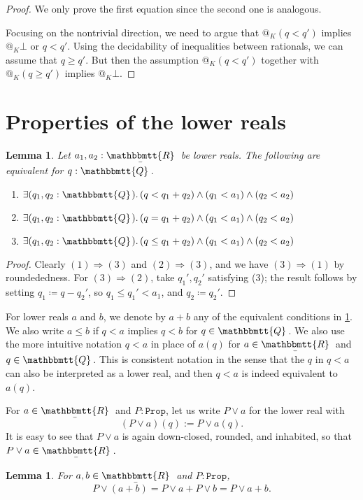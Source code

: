 \documentclass[11pt, oneside, article]{memoir}
\makeatletter
\theoremstyle{plain}
\newtheorem{lemma}[theorem]{Lemma}
\theoremstyle{definition}
\theoremstyle{remark}
\newcommand{\const}[1]{\mathtt{#1}}
\newcommand{\ubar}[1]{\underaccent{\bar}{#1}}
\newcommand{\internal}[1]{\raisebox{-.03ex}{$\mathbbmtt{#1}$}}
\newcommand{\hs}{\hspace{1.1pt}}
\newcommand{\tQQ}{\internal{Q}\hs}
\newcommand{\tRR}{\internal{R}\hs}
\newcommand{\tLR}{\ubar{\tRR}\hs}
\newcommand{\Prop}{\const{Prop}}
\newcommand{\AtSymbol}{{@}}
\newcommand{\At}[2][]{\AtSymbol^{#1}_{#2}}
\newcommand{\imp}{\Rightarrow}
\makeatother
\begin{document}
\begin{proof}
	We only prove the first equation since the second one is analogous.

	Focusing on the nontrivial direction, we need to argue that $\At{K}(q < q')$ implies $\At{K}\bot$ or $q < q'$. Using the decidability of inequalities between rationals, we can assume that $q \geq q'$. But then the assumption $\At{K}(q < q')$ together with $\At{K}(q \geq q')$ implies $\At{K}\bot$.
\end{proof}

\section{Properties of the lower reals}

\begin{lemma}\label{lemma.plus_def}
Let $a_1,a_2:\tLR$ be lower reals. The following are equivalent for $q:\tQQ$.
\begin{enumerate}
	\item $\exists(q_1,q_2:\tQQ)\ldotp (q<q_1+q_2)\wedge(q_1<a_1)\wedge(q_2<a_2)$
	\item $\exists(q_1,q_2:\tQQ)\ldotp (q=q_1+q_2)\wedge(q_1<a_1)\wedge(q_2<a_2)$
	\item $\exists(q_1,q_2:\tQQ)\ldotp (q\leq q_1+q_2)\wedge(q_1<a_1)\wedge(q_2<a_2)$
\end{enumerate}
\end{lemma}
\begin{proof}
Clearly $(1)\imp(3)$ and $(2)\imp(3)$, and we have $(3)\imp(1)$ by roundededness. For $(3)\imp(2)$, take $q_1',q_2'$ satisfying (3); the result follows by setting $q_1\coloneqq q-q_2'$, so $q_1\leq q_1'<a_1$, and $q_2\coloneqq q_2'$.
\end{proof}
For lower reals $a$ and $b$, we denote by $a+b$ any of the equivalent conditions in \cref{lemma.plus_def}. We also write $a\leq b$ if $q < a$ implies $q < b$ for $q\in\tQQ$. We also use the more intuitive notation $q < a$ in place of $a(q)$ for $a\in\tLR$ and $q\in\tQQ$. This is consistent notation in the sense that the $q$ in $q < a$ can also be interpreted as a lower real, and then $q < a$ is indeed equivalent to $a(q)$.

For $a\in\tLR$ and $P : \Prop$, let us write $P \lor a$ for the lower real with
\[
	(P \lor a)(q) := P \lor a(q).
\]
It is easy to see that $P \lor a$ is again down-closed, rounded, and inhabited, so that $P \lor a \in \tLR$. 

\begin{lemma}
	\label{lem.or_add_LR}
	For $a,b\in\tLR$ and $P : \Prop$,
	\[
		P \lor (a + b) = P \lor a + P \lor b = P \lor a + b.
	\]
\end{lemma}
\end{document}
